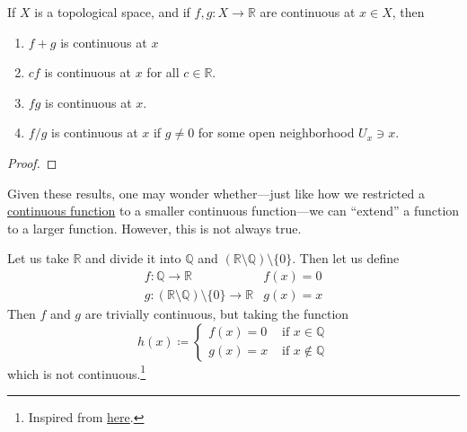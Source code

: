   \begin{theorem}
		\label{thm:arithmetic_continuous}
    If $X$ is a topological space, and if $f, g: X \to \mathbb{R}$ are continuous at $x \in X$, then 
		\begin{enumerate}
		  \item $f + g$ is continuous at $x$
			\item $cf$ is continuous at $x$ for all $c \in \mathbb{R}$. 
			\item $fg$ is continuous at $x$. 
			\item $f/g$ is continuous at $x$ if $g \neq 0$ for some open neighborhood $U_x \ni x$. 
		\end{enumerate}
  \end{theorem}
	\begin{proof}
	  
	\end{proof}

  Given these results, one may wonder whether---just like how we restricted a \hyperref[def:continuous_func]{continuous function} to a smaller continuous function---we can ``extend'' a function to a larger function. However, this is not always true. 

  \begin{example}
    \label{ex:combining-continuous-functions-may-not-be}
    Let us take $\mathbb{R}$ and divide it into $\mathbb{Q}$ and $(\mathbb{R} \setminus \mathbb{Q}) \setminus \{0\}$. Then let us define 
    \begin{align}
      f: \mathbb{Q} \rightarrow \mathbb{R} & f(x) = 0 \\ 
      g: (\mathbb{R} \setminus \mathbb{Q}) \setminus \{0\} \rightarrow \mathbb{R} & g(x) = x
    \end{align}
    Then $f$ and $g$ are trivially continuous, but taking the function 
    \begin{equation}
      h(x) \coloneqq \begin{cases} 
        f(x) = 0 & \text{ if } x \in \mathbb{Q} \\ 
        g(x) = x & \text{ if } x \not\in \mathbb{Q}
      \end{cases}
    \end{equation}
    which is not continuous.\footnote{Inspired from \href{https://math.stackexchange.com/questions/4034361/any-counter-example-of-pasting-lemma}{here}. }
  \end{example} 

